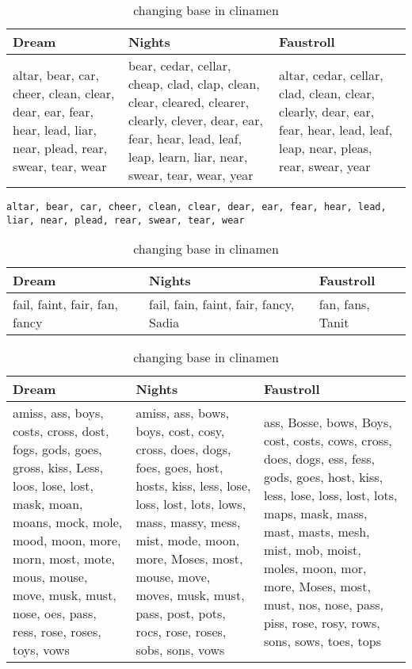 \begin{table}
  \centering
  \begin{tabu}{X[l]X[1.5,l]X[l]}
  \toprule
  \textbf{Dream} & \textbf{Nights} & \textbf{Faustroll}\\
  \midrule
  altar, bear, car, cheer, clean, clear, dear, ear, fear, hear, lead, liar, near, plead, rear, swear, tear, wear & bear, cedar, cellar, cheap, clad, clap, clean, clear, cleared, clearer, clearly, clever, dear, ear, fear, hear, lead, leaf, leap, learn, liar, near, swear, tear, wear, year & altar, cedar, cellar, clad, clean, clear, clearly, dear, ear, fear, hear, lead, leaf, leap, near, pleas, rear, swear, year\\
  \bottomrule
  \end{tabu}
\caption[Changing base in clinamen]{changing base in clinamen}
\label{tab:baseclear}
\end{table}

\begin{verbatim}
altar, bear, car, cheer, clean, clear, dear, ear, fear, hear, lead, liar, near, plead, rear, swear, tear, wear
\end{verbatim}


\begin{table}
  \centering
  \begin{tabu}{X[l]X[1.5,l]X[l]}
  \toprule
  \textbf{Dream} & \textbf{Nights} & \textbf{Faustroll}\\
  \midrule
  fail, faint, fair, fan, fancy & fail, fain, faint, fair, fancy, Sadia & fan, fans, Tanit\\
  \bottomrule
  \end{tabu}
\caption[Changing base in clinamen]{changing base in clinamen}
\label{tab:basefania}
\end{table}

\begin{table}
  \centering
  \begin{tabu}{X[l]X[l]X[l]}
  \toprule
  \textbf{Dream} & \textbf{Nights} & \textbf{Faustroll}\\
  \midrule
  amiss, ass, boys, costs, cross, dost, fogs, gods, goes, gross, kiss, Less, loos, lose, lost, mask, moan, moans, mock, mole, mood, moon, more, morn, most, mote, mous, mouse, move, musk, must, nose, oes, pass, ress, rose, roses, toys, vows & amiss, ass, bows, boys, cost, cosy, cross, does, dogs, foes, goes, host, hosts, kiss, less, lose, loss, lost, lots, lows, mass, massy, mess, mist, mode, moon, more, Moses, most, mouse, move, moves, musk, must, pass, post, pots, rocs, rose, roses, sobs, sons, vows & ass, Bosse, bows, Boys, cost, costs, cows, cross, does, dogs, ess, fess, gods, goes, host, kiss, less, lose, loss, lost, lots, maps, mask, mass, mast, masts, mesh, mist, mob, moist, moles, moon, mor, more, Moses, most, must, nos, nose, pass, piss, rose, rosy, rows, sons, sows, toes, tops\\
  \bottomrule
  \end{tabu}
\caption[Changing base in clinamen]{changing base in clinamen}
\label{tab:basemoss}
\end{table}


